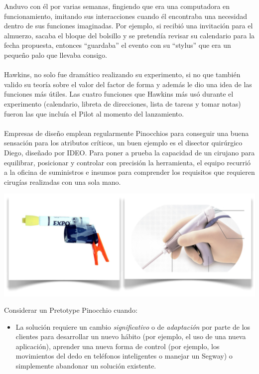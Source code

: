\documentclass{article}
\begin{document}
\begin{enumerate}
Anduvo con \'el por varias semanas, fingiendo que era una computadora en funcionamiento, imitando sus interacciones cuando \'el encontraba una necesidad dentro de sus funciones imaginadas. Por ejemplo, si recibi\'o una invitaci\'on para el almuerzo, sacaba el bloque del bolsillo y se pretend\'ia revisar su calendario para la fecha propuesta, entonces ``guardaba'' el evento con su ``stylus'' que era un peque\~no palo que llevaba consigo.
\\ \\
Hawkins, no solo fue dram\'atico realizando su experimento, si no que tambi\'en valido su teor\'ia sobre el valor del factor de forma y adem\'as le dio una idea de las funciones m\'as \'utiles. Las cuatro funciones que Hawkins m\'as us\'o durante el experimento (calendario, libreta de direcciones, lista de tareas y tomar notas) fueron las que inclu\'ia el Pilot al momento del lanzamiento.
\\ \\
Empresas de dise\~no emplean regularmente Pinocchios para conseguir una buena sensaci\'on para los atributos cr\'iticos, un buen ejemplo es el disector quir\'urgico Diego, dise\~nado por IDEO. Para poner a prueba la capacidad de un cirujano para equilibrar, posicionar y controlar con precisi\'on la herramienta, el equipo recurri\'o a la oficina de suministros e insumos para comprender los requisitos que requieren cirug\'ias realizadas con una sola mano.

\begin{center}
    \includegraphics[width=1.0\textwidth]{diego}
\end{center}

Considerar un Pretotype Pinocchio cuando:

\begin{itemize}

\item La soluci\'on requiere un cambio \textit{significativo} o de \textit{adaptaci\'on} por parte de los clientes para desarrollar un nuevo h\'abito (por ejemplo, el uso de una nueva aplicaci\'on), aprender una nueva forma de control (por ejemplo, los movimientos del dedo en tel\'efonos inteligentes o manejar un Segway) o simplemente abandonar un soluci\'on existente.


\end{itemize}
\end{enumerate}
\end{document}
